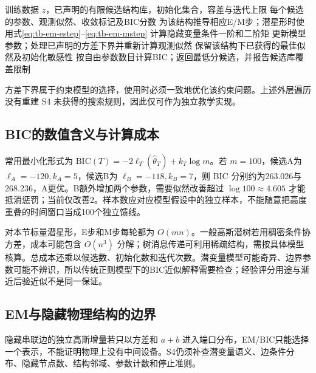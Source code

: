 \begin{algorithm}[htbp]
\caption{教学算法：固定高斯潜星形模型的EM及外层候选评分}
\begin{algorithmic}[1]
\Require 训练数据 $z$，已声明的有限候选结构库，初始化集合，容差与迭代上限
\Ensure 每个候选的参数、观测似然、收敛标记及BIC分数
\State 为该结构推导相应E/M步；潜星形时使用式\eqref{eq:tb-em-estep}--\eqref{eq:tb-em-mstep}
\Repeat
\State 计算隐藏变量条件一阶和二阶矩
\State 更新模型参数；处理已声明的方差下界并重新计算观测似然
\State 保留该结构下已获得的最佳似然及初始化敏感性
\EndFor
\State 按自由参数数目计算BIC；返回最低分候选，并报告候选库覆盖限制
\end{algorithmic}
\end{algorithm}
方差下界属于约束模型的选择，使用时必须一致地优化该约束问题。上述外层遍历没有重建 S4 未获得的搜索规则，因此仅可作为独立教学实现。

\subsection{BIC的数值含义与计算成本}
常用最小化形式为 $\mathrm{BIC}(T)=-2\ell_T(\widehat\theta_T)+k_T\log m$。若 $m=100$，候选A为 $\ell_A=-120,k_A=5$，候选B为 $\ell_B=-118,k_B=7$，则 BIC 分别约为263.026与268.236，A更优。B额外增加两个参数，需要似然改善超过 $\log100\approx4.605$ 才能抵消惩罚；当前仅改善2。样本数应对应模型假设中的独立样本，不能随意把高度重叠的时间窗口当成100个独立馈线。

对本节标量潜星形，E步和M步每轮都为 $O(mn)$。一般高斯潜树若用稠密条件协方差，成本可能包含 $O(n^3)$ 分解；树消息传递可利用稀疏结构，需按具体模型核算。总成本还乘以候选数、初始化数和迭代次数。潜变量模型可能奇异、边界参数可能不辨识，所以传统正则模型下的BIC近似解释需要检查；经验评分用途与渐近后验近似不是同一保证。

\subsection{EM与隐藏物理结构的边界}
隐藏串联边的独立高斯增量若只以方差和 $a+b$ 进入端口分布，EM/BIC只能选择一个表示，不能证明物理上没有中间设备。S4仍须补查潜变量语义、边条件分布、隐藏节点数、结构邻域、参数计数和停止准则。
